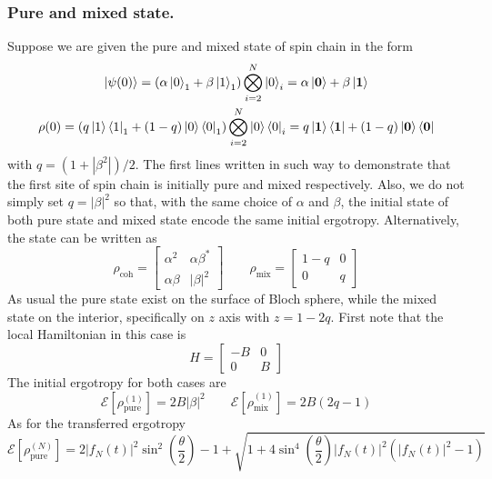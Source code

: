 \documentclass[../../../main.tex]{subfiles}
\begin{document}
\subsubsection{Pure and mixed state.}
Suppose we are given the pure and mixed state of spin chain in the form
\begin{gather*}
  \ket{\psi(0)} = \left(\alpha\ket{0}_1 + \beta\ket{1}_1\right)\bigotimes_{i=2}^{N}\ket{0}_i  = \alpha\ket{\mathbf{0}} + \beta\ket{\mathbf{1}}\\
  \rho(0) = \left(q\ket{1}\bra{1}_1 + (1-q)\ket{0}\bra{0}_1\right)\bigotimes_{i=2}^{N}\ket{0}\bra{0}_i = q\ket{\mathbf{1}}\bra{\mathbf{1}} + (1-q)\ket{\mathbf{0}}\bra{\mathbf{0}}
\end{gather*}
with $q = (1+|\beta^2|)/2$.
The first lines written in such way to demonstrate that the first site of spin chain is initially pure and mixed respectively.
Also, we do not simply set $q=|\beta|^2$ so that, with the same choice of $\alpha$ and $\beta$, the initial state of both pure state and mixed state encode the same initial ergotropy.
Alternatively, the state can be written as
\begin{equation*}
  \rho_\text{coh}
  = \begin{bmatrix}
    \alpha^2    & \alpha\beta^* \\
    \alpha\beta & |\beta|^2
  \end{bmatrix}
  \qquad
  \rho_\text{mix}
  = \begin{bmatrix}
    1-q & 0 \\
    0   & q
  \end{bmatrix}
\end{equation*}
As usual the pure state exist on the surface of Bloch sphere, while the mixed state on the interior, specifically on $z$ axis with $z = 1-2q$.
First note that the local Hamiltonian in this case is
\begin{equation*}
  H = \begin{bmatrix}
    -B & 0 \\
    0  & B
  \end{bmatrix}
\end{equation*}
The initial ergotropy for both cases are
\begin{equation*}
  \mathcal{E}\left[ \rho_{\text{pure}}^{(1)} \right]  = 2B|\beta|^2 \qquad
  \mathcal{E}\left[ \rho_{\text{mix}}^{(1)} \right] = 2B (2q-1)
\end{equation*}
As for the transferred ergotropy
\begin{equation*}
  \mathcal{E}\left[ \rho_{\text{pure}}^{(N)} \right]= 2|f_N(t)|^2\sin^2\left(\frac{\theta}{2}\right)-1+\sqrt{1+4\sin^4\left(\frac{\theta}{2}\right)|f_N(t)|^2\left(|f_N(t)|^2-1\right)}
\end{equation*}
\end{document}
